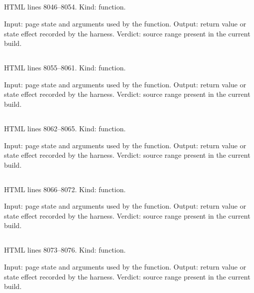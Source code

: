 \subsection*{\texttt{}}
\label{vf_422_table}
HTML lines 8046--8054. Kind: function.

Input: page state and arguments used by the function.
Output: return value or state effect recorded by the harness.
Verdict: source range present in the current build.

\subsection*{\texttt{}}
\label{vf_423_download}
HTML lines 8055--8061. Kind: function.

Input: page state and arguments used by the function.
Output: return value or state effect recorded by the harness.
Verdict: source range present in the current build.

\subsection*{\texttt{}}
\label{vf_424_websiteSource}
HTML lines 8062--8065. Kind: function.

Input: page state and arguments used by the function.
Output: return value or state effect recorded by the harness.
Verdict: source range present in the current build.

\subsection*{\texttt{}}
\label{vf_425_makeWebsiteArchive}
HTML lines 8066--8072. Kind: function.

Input: page state and arguments used by the function.
Output: return value or state effect recorded by the harness.
Verdict: source range present in the current build.

\subsection*{\texttt{}}
\label{vf_426_downloadWebsiteArchive}
HTML lines 8073--8076. Kind: function.

Input: page state and arguments used by the function.
Output: return value or state effect recorded by the harness.
Verdict: source range present in the current build.

